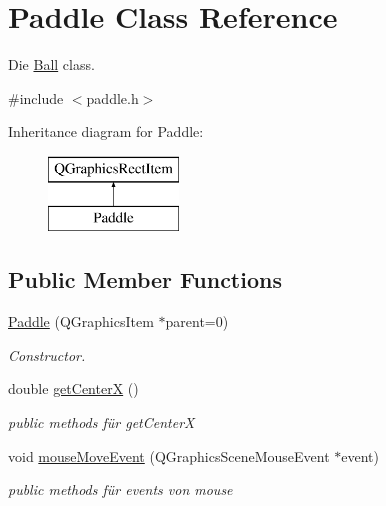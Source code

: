 \hypertarget{class_paddle}{}\section{Paddle Class Reference}
\label{class_paddle}


Die \hyperlink{class_ball}{Ball} class.  




{\ttfamily \#include $<$paddle.\+h$>$}

Inheritance diagram for Paddle\+:\begin{figure}[H]
\begin{center}
\leavevmode
\includegraphics[height=2.000000cm]{class_paddle}
\end{center}
\end{figure}
\subsection*{Public Member Functions}
\begin{DoxyCompactItemize}
\item 
\hyperlink{class_paddle_ab8dfa8e73e79ae577fcd90bc7016aef0}{Paddle} (Q\+Graphics\+Item $\ast$parent=0)
\begin{DoxyCompactList}\small\item\em Constructor. \end{DoxyCompactList}\item 
\mbox{\label{class_paddle_ad6f95463e709f2d915403813071a3a17}} 
double \hyperlink{class_paddle_ad6f95463e709f2d915403813071a3a17}{get\+CenterX} ()
\begin{DoxyCompactList}\small\item\em public methods für get\+CenterX \end{DoxyCompactList}\item 
\mbox{\label{class_paddle_aa66dccdb50eef525d75e2f9ddae4f449}} 
void \hyperlink{class_paddle_aa66dccdb50eef525d75e2f9ddae4f449}{mouse\+Move\+Event} (Q\+Graphics\+Scene\+Mouse\+Event $\ast$event)
\begin{DoxyCompactList}\small\item\em public methods für events von mouse \end{DoxyCompactList}\end{DoxyCompactItemize}


